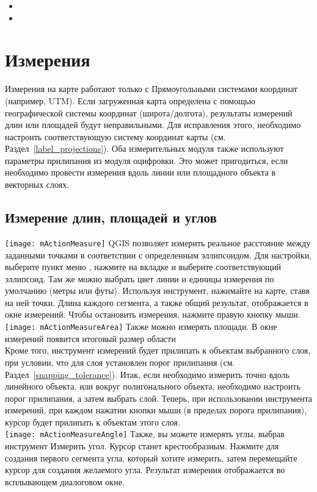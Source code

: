 \begin{itemize}
\item {}
\item {}
\end{itemize}

\section{Измерения}\label{sec:measure}

Измерения на карте работают только с Прямоугольными системами координат
(например, UTM). Если загруженная карта определена с помощью географической
системы координат (широта/долгота), результаты измерений длин или площадей
будут неправильными. Для исправления этого, необходимо настроить
соответствующую систему координат карты (см. Раздел~\ref{label_projections}).
Оба измерительных модуля также используют параметры прилипания из модуля
оцифровки. Это может пригодиться, если необходимо провести измерения вдоль
линии или площадного объекта в векторных слоях.

\subsection{Измерение длин, площадей и углов}

\texttt{[image: mActionMeasure]}
QGIS позволяет измерить реальное расстояние между заданными точками в
соответствии с определенным эллипсоидом. Для настройки, выберите пункт
меню  \arrow {}, нажмите
на вкладке  и выберите соответствующий эллипсоид. Там
же можно выбрать цвет линии и единицы измерения по умолчанию (метры или футы).
Используя инструмент, нажимайте на карте, ставя на ней точки. Длина каждого
сегмента, а также общий результат, отображается в окне измерений. Чтобы
остановить измерения, нажмите правую кнопку мыши. \\
\texttt{[image: mActionMeasureArea]} Также можно измерять
площади. В окне измерений появится итоговый размер области  \\
Кроме того, инструмент измерений будет прилипать к объектам выбранного слоя,
при условии, что для слоя установлен порог прилипания
(см. Раздел~\ref{snapping_tolerance}). Итак, если необходимо измерить точно
вдоль линейного объекта, или вокруг полигонального объекта, необходимо
настроить порог прилипания, а затем выбрать слой. Теперь, при использовании
инструмента измерений, при каждом нажатии кнопки мыши (в пределах порога
прилипания), курсор будет прилипать к объектам этого слоя. \\
\texttt{[image: mActionMeasureAngle]}
Также, вы можете измерять углы, выбрав инструмент Измерить угол. Курсор
станет крестообразным. Нажмите для создания первого сегмента угла, который
хотите измерить, затем перемещайте курсор для создания желаемого угла.
Результат измерения отображается во всплывающем диалоговом окне.

